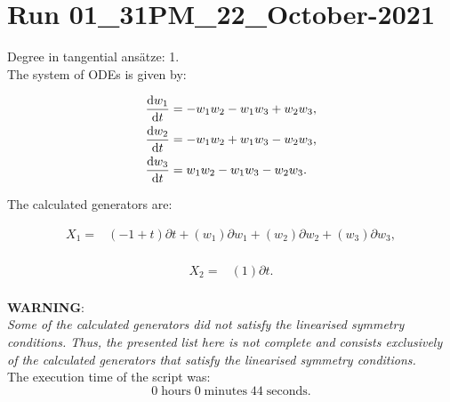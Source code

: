 \section*{Run 01\_31PM\_22\_October-2021}
Degree in tangential ansätze:	1.\\
The system of ODEs is given by:

\begin{align*}
\dv{w_{1}}{t}&=- w_{1} w_{2} - w_{1} w_{3} + w_{2} w_{3},\\
\dv{w_{2}}{t}&=- w_{1} w_{2} + w_{1} w_{3} - w_{2} w_{3},\\
\dv{w_{3}}{t}&=w_{1} w_{2} - w_{1} w_{3} - w_{2} w_{3}.\\
\end{align*}

\noindent The calculated generators are:

\begin{align*}
X_{1}=&\left(-1+t \right)\partial t+\left(w_{1} \right)\partial w_{1}+\left(w_{2} \right)\partial w_{2}+\left(w_{3} \right)\partial w_{3},\\
\end{align*}

\begin{align*}
X_{2}=&\left(1 \right)\partial t.\\
\end{align*}

\noindent\huge\textbf{WARNING}:\\
\noindent\Large\textit{Some of the calculated generators did not satisfy the linearised symmetry conditions. Thus, the presented list here is not complete and consists exclusively of the calculated generators that satisfy the linearised symmetry conditions.}\normalsize\\[2cm]
\noindent The execution time of the script was:
$$0\;\mathrm{hours}\;0\;\mathrm{minutes}\;44 \;\mathrm{seconds}.$$
